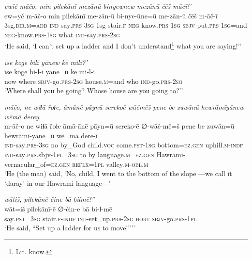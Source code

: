 \ea \label{ŽH.13}
\textit{ewīč māčo, min pilekānī mezānū binyewnew mezānū čēš māčī!’} \\ 
\gll ew=yč m-āč-o min pilekānī me-zān-ū bi-nye-ūne=ū me-zān-ū čēš m-āč-ī \\ 
 3sg\textsc{.dir}\textsc{.m}\textsc{=add} \textsc{ind-}say\textsc{.prs}\textsc{-3sg} 1sg stair\textsc{\textsc{.f}} \textsc{neg-}know\textsc{.prs}\textsc{-1sg} \textsc{sbjv-}put\textsc{.prs}\textsc{-1sg}=and \textsc{neg-}know\textsc{.prs}\textsc{-1sg} what \textsc{ind-}say\textsc{.prs}-\textsc{2sg} \\ 
\glt `He said, ‘I can’t set up a ladder and I don’t understand\footnote{Lit. know.}  what you are saying!’'
\z 
 
\ea \label{ŽH.17}
\textit{īse koge bilī yānew kē milī?’} \\ 
\gll īse koge bi-l-ī yāne=ū kē mi-l-ī \\ 
 now where \textsc{sbjv-}go\textsc{.prs}-\textsc{2sg} house\textsc{.m}=and who \textsc{ind-}go\textsc{.prs}-\textsc{2sg} \\ 
\glt `Where shall you be going? Whose house are you going to?’'
\z 
 
\ea \label{ŽH.23}
\textit{māčo, ne wiɫā řoɫe, āmānē pāynū serekoē wāčmēš pene be zuwānū hewrāmīyānew wēmā derey} \\ 
\gll m-āč-o ne wiɫā řoɫe āmā-ānē pāyn=ū sereko-ē ∅-wāč-mē=š pene be zuwān=ū hewrāmī-yāne=ū wē=mā dere-ī \\ 
 \textsc{ind-}say\textsc{.prs}\textsc{-3sg} no by\_God child.\textsc{voc} come\textsc{.pst}\textsc{-1sg} bottom\textsc{=ez}\textsc{.gen} uphill\textsc{.m}\textsc{-indf} \textsc{ind-}say\textsc{.prs}.sbjv\textsc{-1pl}\textsc{=3sg} to by language\textsc{.m}\textsc{=ez}\textsc{.gen} Hawrami-vernacular\_of\textsc{=ez}\textsc{.gen} \textsc{reflx}\textsc{=1pl} valley\textsc{.m}\textsc{-obl}\textsc{.m} \\ 
\glt `He (the man) said, ‘No, child, I went to the bottom of the slope —we call it ‘daray’ in our Hawrami language—'
\z 
 
\ea \label{ŽH.25}
\textit{wātiš, pilekānē čine bā bilmē!”} \\ 
\gll wāt=iš pilekānī-ē ∅-čin-e bā bi-l-mē \\ 
 say\textsc{.pst}\textsc{=3sg} stair\textsc{\textsc{.f}}\textsc{-indf} \textsc{ind-}set\_up\textsc{.prs}-\textsc{2sg} \textsc{hort} \textsc{sbjv-}go\textsc{.prs}\textsc{-1pl} \\ 
\glt `He said, “Set up a ladder for us to move!”’'
\z 
 

